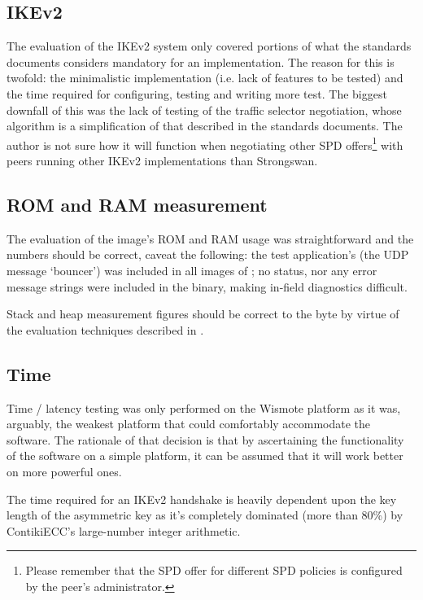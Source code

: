 \documentclass[final,a4paper,twoside,11pt,onecolumn]{report}
\begin{document}
\subsection{IKEv2}
The evaluation of the IKEv2 system only covered portions of what the standards documents considers mandatory for an implementation. The reason for this is twofold: the minimalistic implementation (i.e. lack of features to be tested) and the time required for configuring, testing and writing more test. The biggest downfall of this was the lack of testing of the traffic selector negotiation, whose algorithm is a simplification of that described in the standards documents. The author is not sure how it will function when negotiating other SPD offers\footnote{Please remember that the SPD offer for different SPD policies is configured by the peer's administrator.} with peers running other IKEv2 implementations than Strongswan.

\subsection{ROM and RAM measurement}
The evaluation of the image's ROM and RAM usage was straightforward and the numbers should be correct, caveat the following: the test application's (the UDP message `bouncer') was included in all images of ; no status, nor any error message strings were included in the binary, making in-field diagnostics difficult.

Stack and heap measurement figures should be correct to the byte by virtue of the evaluation techniques described in .

\subsection{Time}
Time / latency testing was only performed on the Wismote platform as it was, arguably, the weakest platform that could comfortably accommodate the software. The rationale of that decision is that by ascertaining the functionality of the software on a simple platform, it can be assumed that it will work better on more powerful ones.

The time required for an IKEv2 handshake is heavily dependent upon the key length of the asymmetric key as it's completely dominated (more than 80\%) by ContikiECC's large-number integer arithmetic.

\end{document}
